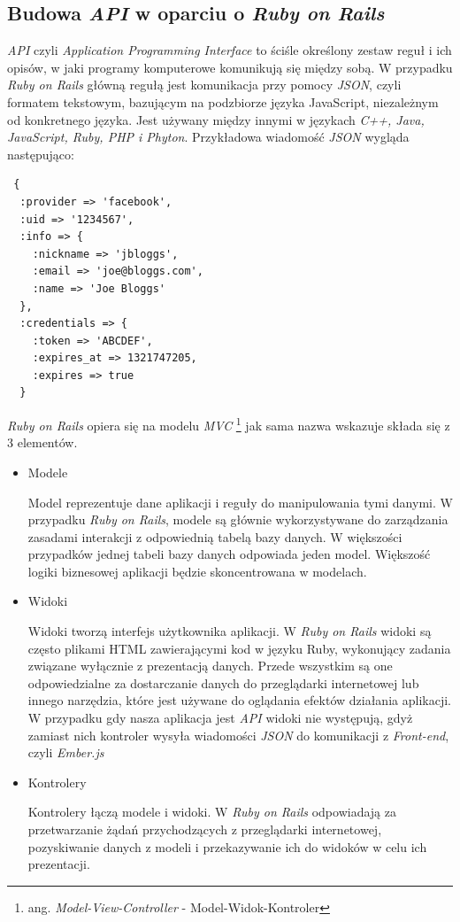 \documentclass[openright]{xmgr}
\begin{document}
\subsection{Budowa \textit{API} w oparciu o \textit{Ruby on Rails}}
\textit{API} czyli \textit{Application Programming Interface} to  ściśle określony zestaw reguł i ich opisów, w jaki programy komputerowe komunikują się między sobą. W przypadku \textit{Ruby on Rails} główną regułą jest komunikacja przy pomocy \textit{JSON}, czyli formatem tekstowym, bazującym na podzbiorze języka JavaScript, niezależnym od konkretnego języka. Jest używany między innymi w językach \textit{ C++, Java, JavaScript, Ruby, PHP i Phyton}. Przykładowa wiadomość \textit{JSON} wygląda następująco:
\begin{verbatim}
 {
  :provider => 'facebook',
  :uid => '1234567',
  :info => {
    :nickname => 'jbloggs',
    :email => 'joe@bloggs.com',
    :name => 'Joe Bloggs'
  },
  :credentials => {
    :token => 'ABCDEF', 
    :expires_at => 1321747205, 
    :expires => true 
  }
\end{verbatim}
\newpage
\indent \textit{Ruby on Rails} opiera się na modelu \textit{MVC} \footnote{ang. \textit{Model-View-Controller} - Model-Widok-Kontroler} jak sama nazwa wskazuje składa się z 3 elementów.  
\begin{itemize}
  \item Modele

Model reprezentuje dane aplikacji i reguły do manipulowania tymi danymi. W przypadku \textit{Ruby on Rails}, modele są głównie wykorzystywane do zarządzania zasadami interakcji z odpowiednią tabelą bazy danych. W większości przypadków jednej tabeli bazy danych odpowiada jeden model. Większość logiki biznesowej aplikacji będzie skoncentrowana w modelach.
  \item Widoki

Widoki tworzą interfejs użytkownika aplikacji. W \textit{Ruby on Rails} widoki są często plikami HTML zawierającymi kod w języku Ruby, wykonujący zadania związane wyłącznie z prezentacją danych. Przede wszystkim są one odpowiedzialne za dostarczanie danych do przeglądarki internetowej lub innego narzędzia, które jest używane do oglądania efektów działania aplikacji. W przypadku gdy nasza aplikacja jest \textit{API} widoki nie występują, gdyż zamiast nich kontroler wysyła wiadomości \textit{JSON} do komunikacji z \textit{Front-end}, czyli \textit{Ember.js}
  \item Kontrolery

Kontrolery łączą modele i widoki. W \textit{Ruby on Rails} odpowiadają za przetwarzanie żądań przychodzących z przeglądarki internetowej, pozyskiwanie danych z modeli i przekazywanie ich do widoków w celu ich prezentacji.
\end{itemize}
\end{document}
